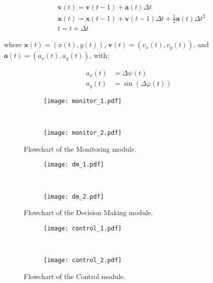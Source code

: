 \begin{equation}
\begin{aligned}
	& \mathbf{v}(t) = \mathbf{v}(t-1) + \mathbf{a}(t)\Delta t\\
	& \mathbf{x}(t) = \mathbf{x}(t-1) + \mathbf{v}(t-1)\Delta t + \frac{1}{2}  \mathbf{a}(t)\Delta t^2 \\
	& t = t + \Delta t
\end{aligned}
\end{equation}

where $\mathbf{x}(t) = (x(t), y(t))$, $\mathbf{v}(t) = (v_x(t), v_y(t))$, and $\mathbf{a}(t) = (a_x(t), a_y(t))$, with:

\begin{equation}
\begin{aligned}
	a_x(t) & = \Delta\psi(t) \\
	a_y(t) & = \sin(\Delta\varphi(t))
\end{aligned}
\end{equation}

\begin{figure}
\centering
\begin{subfigure}{1\textwidth}
  \centering
  \texttt{[image: monitor\_1.pdf]}
\end{subfigure}\\ \vspace{2em}
\begin{subfigure}{1\textwidth}
  \centering
  \texttt{[image: monitor\_2.pdf]}
\end{subfigure} \vspace{2em}
\caption{Flowchart of the Monitoring module.}
\label{fig:monitor}
\end{figure}

\begin{figure}
\centering
\begin{subfigure}{1\textwidth}
  \centering
  \texttt{[image: dm\_1.pdf]}
\end{subfigure}\\ \vspace{2em}
\begin{subfigure}{1\textwidth}
  \centering
  \texttt{[image: dm\_2.pdf]}
\end{subfigure} \vspace{2em}
\caption{Flowchart of the Decision Making module.}
\label{fig:dm}
\end{figure}

\begin{figure}
\centering
\begin{subfigure}{1\textwidth}
  \centering
  \texttt{[image: control\_1.pdf]}
\end{subfigure}\\ \vspace{2em}
\begin{subfigure}{1\textwidth}
  \centering
  \texttt{[image: control\_2.pdf]}
\end{subfigure} \vspace{2em}
\caption{Flowchart of the Control module.}
\label{fig:control}
\end{figure}

